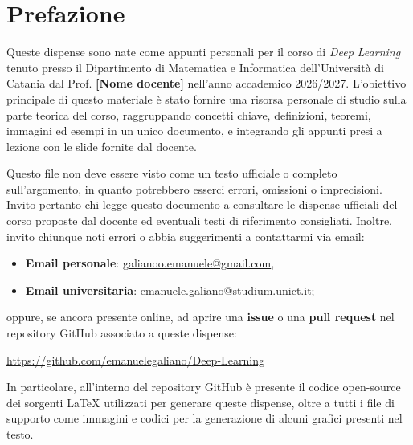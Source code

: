 \chapter*{Prefazione}

\setlength{\parskip}{0.8em}
\setlength{\parindent}{0pt}

Queste dispense sono nate come appunti personali per il corso di \emph{Deep Learning} tenuto presso il Dipartimento di Matematica e Informatica dell'Universit\`a di Catania dal Prof. \textbf{[Nome docente]} nell'anno accademico 2026/2027. L'obiettivo principale di questo materiale è stato fornire una risorsa personale di studio sulla parte teorica del corso, raggruppando concetti chiave, definizioni, teoremi, immagini ed esempi in un unico documento, e integrando gli appunti presi a lezione con le slide fornite dal docente.

Questo file non deve essere visto come un testo ufficiale o completo sull'argomento, in quanto potrebbero esserci errori, omissioni o imprecisioni. Invito pertanto chi legge questo documento a consultare le dispense ufficiali del corso proposte dal docente ed eventuali testi di riferimento consigliati. Inoltre, invito chiunque noti errori o abbia suggerimenti a contattarmi via email:
\begin{itemize}
    \item \textbf{Email personale}: \href{mailto:galianoo.emanuele@gmail.com}{galianoo.emanuele@gmail.com},
    \item \textbf{Email universitaria}: \href{mailto:emanuele.galiano@studium.unict.it}{emanuele.galiano@studium.unict.it};
\end{itemize}

\noindent
oppure, se ancora presente online, ad aprire una \textbf{issue} o una \textbf{pull request} nel repository GitHub associato a queste dispense:
\begin{center}
\begin{minipage}{0.92\textwidth}
\centering
\url{https://github.com/emanuelegaliano/Deep-Learning}
\end{minipage}
\end{center}

In particolare, all'interno del repository GitHub è presente il codice open-source dei sorgenti \LaTeX{} utilizzati per generare queste dispense, oltre a tutti i file di supporto come immagini e codici per la generazione di alcuni grafici presenti nel testo.
